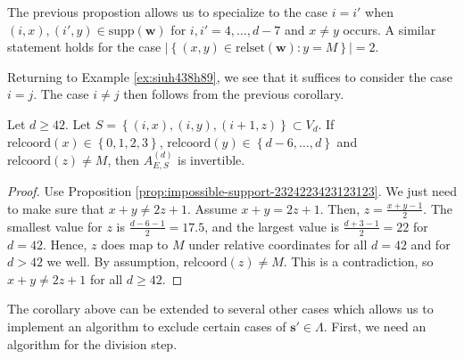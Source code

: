 \begin{corollary}
    The previous propostion allows us to specialize to the case \( i = i' \) when \( (i,x), (i',y) \in \mathrm{supp}(\mathbf{w}) \) for \( i,i' = 4, \dots, d-7 \) and \( x \neq y \) occurs. A similar statement holds for the case \( \lvert \left\{ (x,y) \in \mathrm{relset}(\mathbf{w}) : y = M \right\} \rvert = 2 \).
\end{corollary}

\begin{example}
    Returning to Example \ref{ex:siuh438h89}, we see that it suffices to consider the case \( i = j \). The case \( i \neq j \) then follows from the previous corollary.
\end{example}

\begin{corollary}
    Let \( d \geq 42 \).
    Let \( S = \left\{ (i,x), (i,y), (i+1,z) \right\} \subset V_d \). If \( \mathrm{relcoord}(x) \in \left\{ 0,1,2,3 \right\} \), \( \mathrm{relcoord}(y) \in \left\{ d-6, \dots, d \right\} \) and \( \mathrm{relcoord}(z) \neq M  \), then \( A^{(d)}_{E, S} \) is invertible.
\end{corollary}

\begin{proof}
    Use Proposition \ref{prop:impossible-support-2324223423123123}. We just need to make sure that \( x + y \neq 2z + 1 \). Assume \( x + y = 2z + 1 \). Then, \( z = \frac{x+y -1}{2} \). The smallest value for \( z \) is \( \frac{d-6-1}{2} = 17.5 \), and the largest value is \( \frac{d+3-1}{2} = 22 \) for \( d = 42 \). Hence, \( z \) does map to \( M \) under relative coordinates for all \( d = 42 \) and for \( d > 42 \) we well. By assumption,  \( \mathrm{relcoord}(z) \neq M  \). This is a contradiction, so \( x + y \neq 2z + 1 \) for all \( d \geq 42 \).
\end{proof}

The corollary above can be extended to several other cases which allows us to implement an algorithm to exclude certain cases of \( \mathbf{s}' \in \Lambda \). First, we need an algorithm for the division step.

